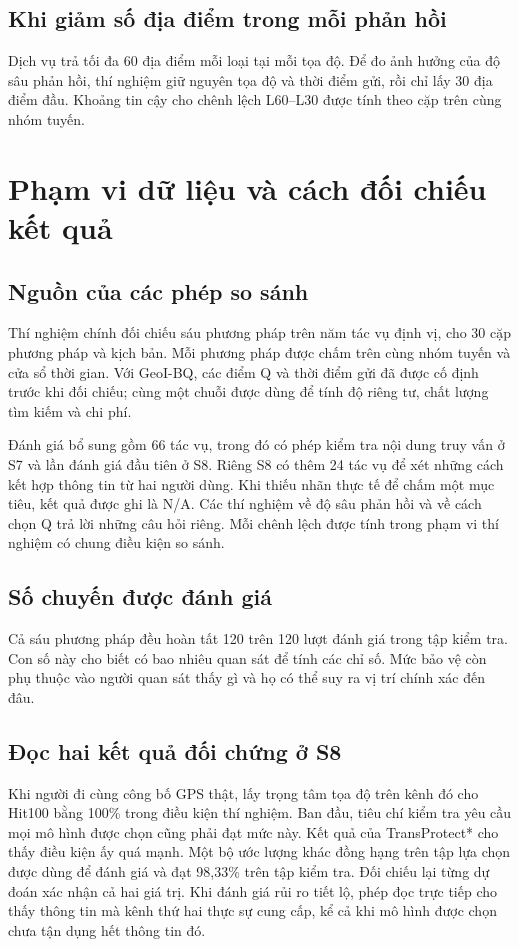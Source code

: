 \section{Khi giảm số địa điểm trong mỗi phản hồi}
Dịch vụ trả tối đa 60 địa điểm mỗi loại tại mỗi tọa độ. Để đo ảnh hưởng của độ sâu phản hồi, thí nghiệm giữ nguyên tọa độ và thời điểm gửi, rồi chỉ lấy 30 địa điểm đầu. Khoảng tin cậy cho chênh lệch L60--L30 được tính theo cặp trên cùng nhóm tuyến.


\chapter{Phạm vi dữ liệu và cách đối chiếu kết quả}\label{app:repro}
\section{Nguồn của các phép so sánh}
Thí nghiệm chính đối chiếu sáu phương pháp trên năm tác vụ định vị, cho 30 cặp phương pháp và kịch bản. Mỗi phương pháp được chấm trên cùng nhóm tuyến và cửa sổ thời gian. Với GeoI-BQ, các điểm Q và thời điểm gửi đã được cố định trước khi đối chiếu; cùng một chuỗi được dùng để tính độ riêng tư, chất lượng tìm kiếm và chi phí.

Đánh giá bổ sung gồm 66 tác vụ, trong đó có phép kiểm tra nội dung truy vấn ở S7 và lần đánh giá đầu tiên ở S8. Riêng S8 có thêm 24 tác vụ để xét những cách kết hợp thông tin từ hai người dùng. Khi thiếu nhãn thực tế để chấm một mục tiêu, kết quả được ghi là N/A. Các thí nghiệm về độ sâu phản hồi và về cách chọn Q trả lời những câu hỏi riêng. Mỗi chênh lệch được tính trong phạm vi thí nghiệm có chung điều kiện so sánh.
\section{Số chuyến được đánh giá}
Cả sáu phương pháp đều hoàn tất 120 trên 120 lượt đánh giá trong tập kiểm tra. Con số này cho biết có bao nhiêu quan sát để tính các chỉ số. Mức bảo vệ còn phụ thuộc vào người quan sát thấy gì và họ có thể suy ra vị trí chính xác đến đâu.

\section{Đọc hai kết quả đối chứng ở S8}
Khi người đi cùng công bố GPS thật, lấy trọng tâm tọa độ trên kênh đó cho Hit100 bằng 100\% trong điều kiện thí nghiệm. Ban đầu, tiêu chí kiểm tra yêu cầu mọi mô hình được chọn cũng phải đạt mức này. Kết quả của TransProtect* cho thấy điều kiện ấy quá mạnh. Một bộ ước lượng khác đồng hạng trên tập lựa chọn được dùng để đánh giá và đạt 98,33\% trên tập kiểm tra. Đối chiếu lại từng dự đoán xác nhận cả hai giá trị. Khi đánh giá rủi ro tiết lộ, phép đọc trực tiếp cho thấy thông tin mà kênh thứ hai thực sự cung cấp, kể cả khi mô hình được chọn chưa tận dụng hết thông tin đó.

